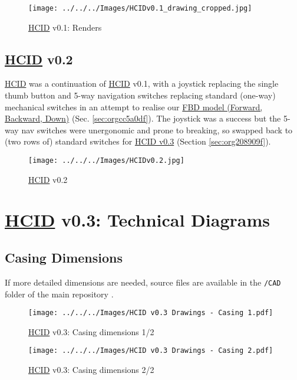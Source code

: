 \documentclass[logo,bsc,singlespacing,parskip]{infthesis}
\begin{document}
\begin{figure}[h]
\centering
\texttt{[image: ../../../Images/HCIDv0.1\_drawing\_cropped.jpg]}
\caption{\hyperref[org30e2275]{HCID} v0.1: Renders}
\end{figure}

\section{\hyperref[org30e2275]{HCID} v0.2}
\label{sec:org9f309fa}
\hyperref[org30e2275]{HCID} was a continuation of \hyperref[org30e2275]{HCID} v0.1, with a joystick replacing the single thumb button and 5-way navigation switches \autocite{5wayNavigationSwitch} replacing standard (one-way) mechanical switches in an attempt to realise our \hyperref[sec:orgcc5a0df]{FBD model (Forward, Backward, Down)} (Sec. \ref{sec:orgcc5a0df}).
The joystick was a success but the 5-way nav switches were unergonomic and prone to breaking, so swapped back to (two rows of) standard switches for \hyperref[sec:org208909f]{HCID v0.3} (Section \ref{sec:org208909f}).

\begin{figure}[h]
\centering
\texttt{[image: ../../../Images/HCIDv0.2.jpg]}
\caption{\hyperref[org30e2275]{HCID} v0.2}
\end{figure}

\chapter{\hyperref[org30e2275]{HCID} v0.3: Technical Diagrams}
\label{sec:org5913b72}
\section{Casing Dimensions}
\label{sec:orgae2cc9e}
If more detailed dimensions are needed, source files are available in the \texttt{/CAD} folder of the main repository \autocite{sharpNazzacodeHCIDMy}.

\begin{landscape}
\begin{figure}[htbp]
\centering
\texttt{[image: ../../../Images/HCID v0.3 Drawings - Casing 1.pdf]}
\caption{\hyperref[org30e2275]{HCID} v0.3: Casing dimensions 1/2}
\end{figure}
\end{landscape}

\begin{landscape}
\begin{figure}[htbp]
\centering
\texttt{[image: ../../../Images/HCID v0.3 Drawings - Casing 2.pdf]}
\caption{\hyperref[org30e2275]{HCID} v0.3: Casing dimensions 2/2}
\end{figure}
\end{landscape}
\restoregeometry
\end{document}
